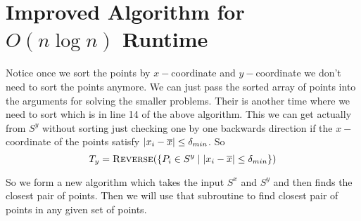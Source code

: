 \section{Improved Algorithm for $O(n\log n)$ Runtime}
Notice once we sort the points by $x-$coordinate and $y-$coordinate we don't need to sort the points anymore. We can just pass the sorted array of points into the arguments for solving the smaller problems. Their is another time where we need to sort which is in line 14 of the above algorithm. This we can get actually from $S^y$ without sorting just checking one by one backwards direction if the $x-$coordinate of the points satisfy $|x_i-\overline{x}|\leq \delta_{min}$. So $$T_y=\textsc{Reverse}(\{P_i\in S^y\mid |x_i-\overline{x}|\leq \delta_{min}\})$$

So we form a new algorithm which takes the input $S^x$ and $S^y$ and then finds the closest pair of points. Then we will use that subroutine to find closest pair of points in any given set of points.

